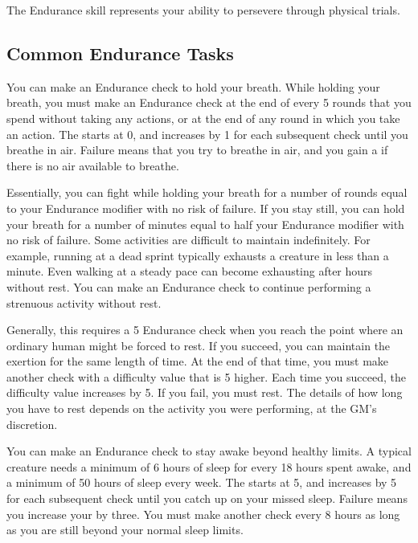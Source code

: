 \newpage
{}
    The Endurance skill represents your ability to persevere through physical trials.

    \subsection{Common Endurance Tasks}
        You can make an Endurance check to hold your breath.
        While holding your breath, you must make an Endurance check at the end of every 5 rounds that you spend without taking any actions, or at the end of any round in which you take an action.
        The  starts at 0, and increases by 1 for each subsequent check until you breathe in air.
        Failure means that you try to breathe in air, and you gain a  if there is no air available to breathe.

        Essentially, you can fight while holding your breath for a number of rounds equal to your Endurance modifier with no risk of failure.
        If you stay still, you can hold your breath for a number of minutes equal to half your Endurance modifier with no risk of failure.
        Some activities are difficult to maintain indefinitely.
        For example, running at a dead sprint typically exhausts a creature in less than a minute.
        Even walking at a steady pace can become exhausting after hours without rest.
        You can make an Endurance check to continue performing a strenuous activity without rest.

        Generally, this requires a  5 Endurance check when you reach the point where an ordinary human might be forced to rest.
        If you succeed, you can maintain the exertion for the same length of time.
        At the end of that time, you must make another check with a difficulty value that is 5 higher.
        Each time you succeed, the difficulty value increases by 5.
        If you fail, you must rest.
        The details of how long you have to rest depends on the activity you were performing, at the GM's discretion.

         You can make an Endurance check to stay awake beyond healthy limits.
        A typical creature needs a minimum of 6 hours of sleep for every 18 hours spent awake, and a minimum of 50 hours of sleep every week.
        The  starts at 5, and increases by 5 for each subsequent check until you catch up on your missed sleep.
        Failure means you increase your  by three.
        You must make another check every 8 hours as long as you are still beyond your normal sleep limits.

